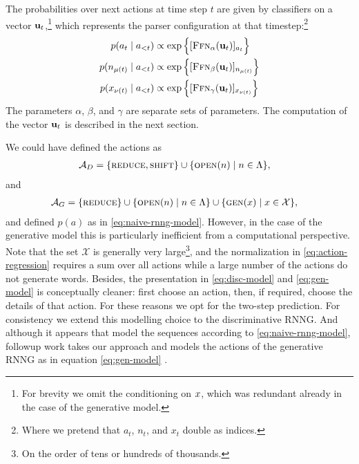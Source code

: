     The probabilities over next actions at time step $t$ are given by classifiers on a vector $\mathbf{u}_t$,\footnote{For brevity we omit the conditioning on $x$, which was redundant already in the case of the generative model.} which represents the parser configuration at that timestep:\footnote{Where we pretend that $a_t$, $n_t$, and $x_t$ double as indices.}
    \begin{align}
      p(a_t \mid a_{<t})
        &\propto \exp \Big\{ [\textsc{Ffn}_{\alpha}( \mathbf{u}_t )]_{a_t}  \Big\}  \\
      p(n_{\mu(t)} \mid a_{<t})
        &\propto \exp \Big\{ [\textsc{Ffn}_{\beta}( \mathbf{u}_t )]_{n_{\mu(t)}}  \Big\}  \\
      p(x_{\nu(t)} \mid a_{<t})
        &\propto \exp \Big\{ [\textsc{Ffn}_{\gamma}( \mathbf{u}_t )]_{x_{\nu(t)}}  \Big\}
      \label{eq:action-regression}
    \end{align}
    The parameters $\alpha$, $\beta$, and $\gamma$ are separate sets of parameters. The computation of the vector $\mathbf{u}_t$ is described in the next section.

    \begin{remark} We could have defined the actions as
      \begin{align*}
        \mathcal{A}_D &= \{ \textsc{reduce}, \textsc{shift} \} \cup \{ \textsc{open}(n) \mid n \in \Lambda \},
      \end{align*}
      and
      \begin{align*}
        \mathcal{A}_G &= \{ \textsc{reduce} \} \cup \{ \textsc{open}(n) \mid n \in \Lambda \} \cup \{ \textsc{gen}(x) \mid x \in \mathcal{X} \},
      \end{align*}
      and defined $p(a)$ as in \ref{eq:naive-rnng-model}. However, in the case of the generative model this is particularly inefficient from a computational perspective. Note that the set $\mathcal{X}$ is generally very large\footnote{On the order of tens or hundreds of thousands.}, and the normalization in \ref{eq:action-regression} requires a sum over all actions while a large number of the actions do not generate words. Besides, the presentation in \ref{eq:disc-model} and \ref{eq:gen-model} is conceptually cleaner: first choose an action, then, if required, choose the details of that action. For these reasons we opt for the two-step prediction. For consistency we extend this modelling choice to the discriminative RNNG. And although it appears that \citet{dyer2016rnng} model the sequences according to \ref{eq:naive-rnng-model}, followup work takes our approach and models the actions of the generative RNNG as in equation \ref{eq:gen-model} \citep{hale2018beam}.
    \end{remark}

